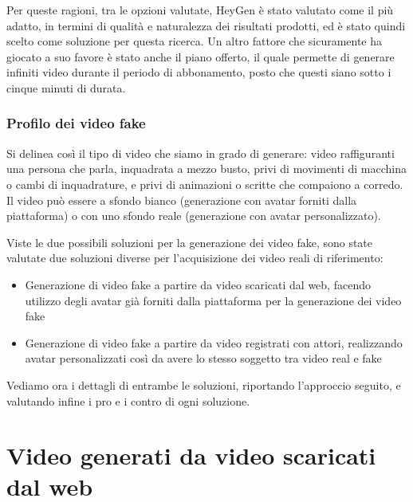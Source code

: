 Per queste ragioni, tra le opzioni valutate, HeyGen è stato valutato come il più adatto, in termini di qualità e naturalezza dei risultati prodotti, ed è stato quindi scelto come soluzione per questa ricerca. Un altro fattore che sicuramente ha giocato a suo favore è stato anche il piano offerto, il quale permette di generare infiniti video durante il periodo di abbonamento, posto che questi siano sotto i cinque minuti di durata.

\subsubsection{Profilo dei video fake}
Si delinea così il tipo di video che siamo in grado di generare: video raffiguranti una persona che parla, inquadrata a mezzo busto, privi di movimenti di macchina o cambi di inquadrature, e privi di animazioni o scritte che compaiono a corredo. Il video può essere a sfondo bianco (generazione con avatar forniti dalla piattaforma) o con uno sfondo reale (generazione con avatar personalizzato).

Viste le due possibili soluzioni per la generazione dei video fake, sono state valutate due soluzioni diverse per l'acquisizione dei video reali di riferimento:
\begin{itemize}
    \item Generazione di video fake a partire da video scaricati dal web, facendo utilizzo degli avatar già forniti dalla piattaforma per la generazione dei video fake
    \item Generazione di video fake a partire da video registrati con attori, realizzando avatar personalizzati così da avere lo stesso soggetto tra video real e fake
\end{itemize}

Vediamo ora i dettagli di entrambe le soluzioni, riportando l'approccio seguito, e valutando infine i pro e i contro di ogni soluzione.

\section{Video generati da video scaricati dal web}

